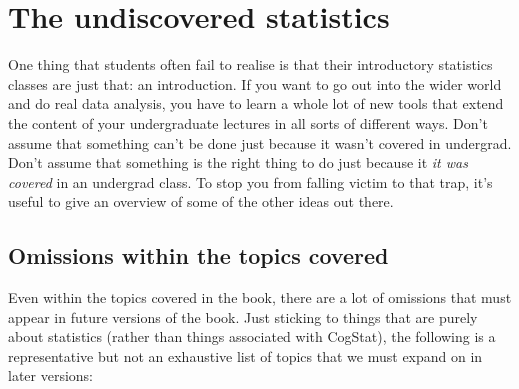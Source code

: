 \documentclass[
]{book}
\theoremstyle{definition}
\theoremstyle{definition}
\theoremstyle{definition}
\theoremstyle{definition}
\theoremstyle{remark}
\begin{document}
\hypertarget{the-undiscovered-statistics}{%
\section*{The undiscovered statistics}\label{the-undiscovered-statistics}}

One thing that students often fail to realise is that their introductory statistics classes are just that: an introduction. If you want to go out into the wider world and do real data analysis, you have to learn a whole lot of new tools that extend the content of your undergraduate lectures in all sorts of different ways. Don't assume that something can't be done just because it wasn't covered in undergrad. Don't assume that something is the right thing to do just because it \emph{it was covered} in an undergrad class. To stop you from falling victim to that trap, it's useful to give an overview of some of the other ideas out there.

\hypertarget{omissions-within-the-topics-covered}{%
\subsection*{Omissions within the topics covered}\label{omissions-within-the-topics-covered}}

Even within the topics covered in the book, there are a lot of omissions that must appear in future versions of the book. Just sticking to things that are purely about statistics (rather than things associated with CogStat), the following is a representative but not an exhaustive list of topics that we must expand on in later versions:
\end{document}
